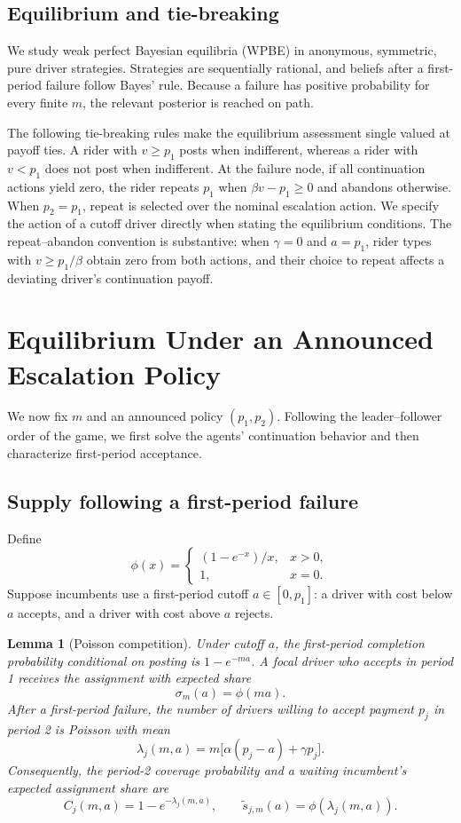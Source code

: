 \documentclass[11pt]{article}
\newtheorem{lemma}{Lemma}
\theoremstyle{definition}
\theoremstyle{remark}
\begin{document}
\subsection{Equilibrium and tie-breaking}

We study weak perfect Bayesian equilibria (WPBE) in anonymous, symmetric, pure
driver strategies.  Strategies are sequentially rational, and beliefs after a
first-period failure follow Bayes' rule.  Because a failure has positive
probability for every finite \(m\), the relevant posterior is reached on path.

The following tie-breaking rules make the equilibrium assessment single
valued at payoff ties.  A rider with \(v\ge p_1\) posts when indifferent,
whereas a rider with \(v<p_1\) does not post when indifferent.  At the failure
node, if all continuation actions yield zero, the rider repeats \(p_1\) when
\(\beta v-p_1\ge0\) and abandons otherwise.  When \(p_2=p_1\), repeat is
selected over the nominal escalation action.  We specify the action of a
cutoff driver directly when stating the equilibrium conditions.  The
repeat--abandon convention is substantive: when \(\gamma=0\) and \(a=p_1\),
rider types with \(v\ge p_1/\beta\) obtain zero from both actions, and their
choice to repeat affects a deviating driver's continuation payoff.

\section{Equilibrium Under an Announced Escalation Policy}
\label{sec:equilibrium}

We now fix \(m\) and an announced policy \((p_1,p_2)\).  Following the
leader--follower order of the game, we first solve the agents' continuation
behavior and then characterize first-period acceptance.

\subsection{Supply following a first-period failure}

Define
\[
  \phi(x)=
  \begin{cases}
    (1-e^{-x})/x, & x>0,\\
    1, & x=0.
  \end{cases}
\]
Suppose incumbents use a first-period cutoff \(a\in[0,p_1]\): a driver with
cost below \(a\) accepts, and a driver with cost above \(a\) rejects.

\begin{lemma}[Poisson competition]
\label{lem:poisson}
Under cutoff \(a\), the first-period completion probability conditional on
posting is \(1-e^{-ma}\).  A focal driver who accepts in period 1 receives the
assignment with expected share
\[
  \sigma_m(a)=\phi(ma).
\]
After a first-period failure, the number of drivers willing to accept payment
\(p_j\) in period 2 is Poisson with mean
\[
  \lambda_j(m,a)
  =m\bigl[\alpha(p_j-a)+\gamma p_j\bigr].
\]
Consequently, the period-2 coverage probability and a waiting incumbent's
expected assignment share are
\[
  C_j(m,a)=1-e^{-\lambda_j(m,a)},
  \qquad
  \widetilde s_{j,m}(a)=\phi(\lambda_j(m,a)).
\]
\end{lemma}
\end{document}
